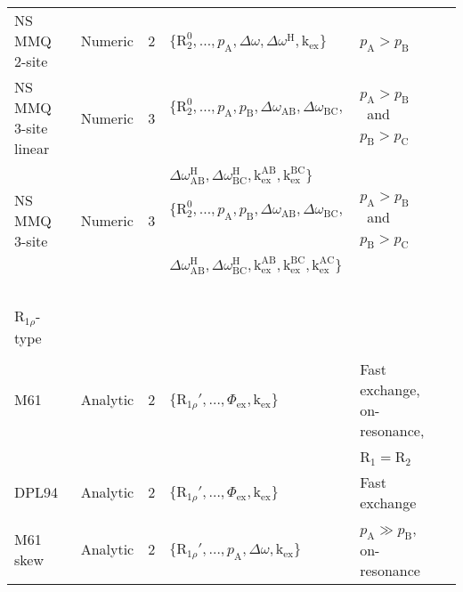 \documentclass[a4paper,11pt,twoside,openright]{book}
\begin{document}
{\begin{landscape}
\begin{center}
\begin{small}
\begin{longtable}{llllll}
NS MMQ 2-site            & Numeric  & 2     & $\{\mathrm{R}_2^0, \dots, p_\textrm{A}, \Delta\omega , \Delta\omega^{\scriptscriptstyle\mathrm{H}}, \textrm{k}_\textrm{ex}\}$\         & $p_\textrm{A}> p_\textrm{B}$\                        & \citet{Korzhnev05b} \\
NS MMQ 3-site linear     & Numeric  & 3     & $\{\mathrm{R}_2^0, \dots, p_\textrm{A}, p_\textrm{B}, \Delta\omega_\textrm{AB}, \Delta\omega_\textrm{BC},$\        & $p_\textrm{A}> p_\textrm{B}$\  and $p_\textrm{B}> p_\textrm{C}$\        & \citet{Korzhnev05b} \\
                         &          &       & $\Delta\omega^{\scriptscriptstyle\mathrm{H}}_\textrm{AB}, \Delta\omega^{\scriptscriptstyle\mathrm{H}}_\textrm{BC}, \textrm{k}_\textrm{ex}^\textrm{AB}, \textrm{k}_\textrm{ex}^\textrm{BC}\}$\  \\
NS MMQ 3-site            & Numeric  & 3     & $\{\mathrm{R}_2^0, \dots, p_\textrm{A}, p_\textrm{B}, \Delta\omega_\textrm{AB}, \Delta\omega_\textrm{BC},$\        & $p_\textrm{A}> p_\textrm{B}$\  and $p_\textrm{B}> p_\textrm{C}$\        & \citet{Korzhnev05b} \\
                         &          &       & $\Delta\omega^{\scriptscriptstyle\mathrm{H}}_\textrm{AB}, \Delta\omega^{\scriptscriptstyle\mathrm{H}}_\textrm{BC}, \textrm{k}_\textrm{ex}^\textrm{AB}, \textrm{k}_\textrm{ex}^\textrm{BC}, \textrm{k}_\textrm{ex}^\textrm{AC}\}$\  \\
\par
\\[-5pt]
$\mathrm{R}_{1\rho}$-type \\
\cline{1-1}
\\[-5pt]
M61                      & Analytic & 2     & $\{\mathrm{R}_{1\rho}', \dots, \Phi_\textrm{ex}, \textrm{k}_\textrm{ex}\}$\             & Fast exchange, on-resonance,      & \citet{Meiboom61} \\
                         &          &       &                                                     & $\mathrm{R}_1= \mathrm{R}_2$\  \\
DPL94                    & Analytic & 2     & $\{\mathrm{R}_{1\rho}', \dots, \Phi_\textrm{ex}, \textrm{k}_\textrm{ex}\}$\             & Fast exchange                     & \citet{Davis94} \\
M61 skew                 & Analytic & 2     & $\{\mathrm{R}_{1\rho}', \dots, p_\textrm{A}, \Delta\omega , \textrm{k}_\textrm{ex}\}$\           & $p_\textrm{A}\gg p_\textrm{B}$, on-resonance       & \citet{Meiboom61} \\

\end{longtable}
\end{small}
\end{center}
\end{landscape}}
\end{document}
